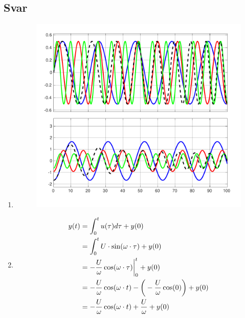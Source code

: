 \documentclass[answers,11pt]{exam}
\begin{document}
\begin{enumerate}[label=\alph*)]
\begin{tcolorbox}
  \end{tcolorbox}

  \newpage
  

  \begin{tcolorbox}
    \subsection*{Svar}

    \begin{enumerate}[label=p\arabic*)]
      \item
            \parbox{\textwidth}{
              \begin{figure}[H]
                \centering
                \hspace{0mm}\scalebox{0.60}
                {\includegraphics{figurer/chirp.pdf}}
                \label{fig:2p1}
              \end{figure}
            }
      \item
            \begin{align}
              y(t) & = \int_{0}^{t} u(\tau)d \tau + y(0) \notag \\
                   & = \int_{0}^{t} U \cdot \sin(\omega \cdot \tau) + y(0) \notag \\
                   & = - \frac{U}{\omega}  \cos(\omega \cdot \tau) \bigg|^t_0 + y(0) \notag \\
                   & = - \frac{U}{\omega} \cos(\omega \cdot t) - \bigg(- \frac{U}{\omega} \cos(0) \bigg) + y(0) \notag \\
                   & = - \frac{U}{\omega} \cos(\omega \cdot t) + \frac{U}{\omega} + y(0) \notag \\
            \end{align}


\end{enumerate}
\end{tcolorbox}
\end{enumerate}
\end{document}

